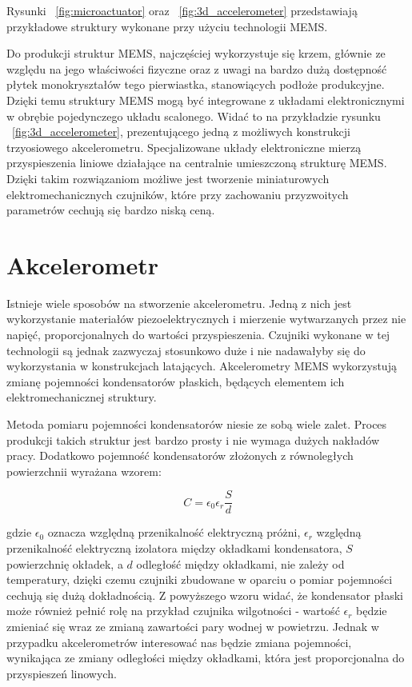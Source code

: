 Rysunki ~\ref{fig:microactuator} oraz ~\ref{fig:3d_accelerometer} przedstawiają przykładowe struktury wykonane przy użyciu technologii MEMS. 

Do produkcji struktur MEMS, najczęściej wykorzystuje się krzem, głównie ze względu na jego właściwości fizyczne oraz z uwagi na bardzo dużą dostępność płytek monokryształów tego pierwiastka, stanowiących podłoże produkcyjne. Dzięki temu struktury MEMS mogą być integrowane z układami elektronicznymi w obrębie pojedynczego układu scalonego. Widać to na przykładzie rysunku ~\ref{fig:3d_accelerometer}, prezentującego jedną z możliwych konstrukcji trzyosiowego akcelerometru. Specjalizowane układy elektroniczne mierzą przyspieszenia liniowe działające na centralnie umieszczoną strukturę MEMS. Dzięki takim rozwiązaniom możliwe jest tworzenie miniaturowych elektromechanicznych czujników, które przy zachowaniu przyzwoitych parametrów cechują się bardzo niską ceną.   

\section{Akcelerometr}

Istnieje wiele sposobów na stworzenie akcelerometru. Jedną z nich jest wykorzystanie materiałów piezoelektrycznych i mierzenie wytwarzanych przez nie napięć, proporcjonalnych do wartości przyspieszenia. Czujniki wykonane w tej technologii są jednak zazwyczaj stosunkowo duże i nie nadawałyby się do wykorzystania w konstrukcjach latających. Akcelerometry MEMS wykorzystują zmianę pojemności kondensatorów płaskich, będących elementem ich elektromechanicznej struktury.

Metoda pomiaru pojemności kondensatorów niesie ze sobą wiele zalet. Proces produkcji takich struktur jest bardzo prosty i nie wymaga dużych nakładów pracy. Dodatkowo pojemność kondensatorów złożonych z równoległych powierzchnii wyrażana wzorem:   

\begin{equation}
C = \epsilon_0\epsilon_r\frac{S}{d}
\end{equation}

gdzie $\epsilon_0$ oznacza względną przenikalność elektryczną próżni, $\epsilon_r$ względną przenikalność elektryczną izolatora między okładkami kondensatora, $S$ powierzchnię okładek, a $d$ odległość między okładkami, nie zależy od temperatury, dzięki czemu czujniki zbudowane w oparciu o pomiar pojemności cechują się dużą dokładnością. Z powyższego wzoru widać, że kondensator płaski może również pełnić rolę na przykład czujnika wilgotności - wartość $\epsilon_r$ będzie zmieniać się wraz ze zmianą zawartości pary wodnej w powietrzu. Jednak w przypadku akcelerometrów interesować nas będzie zmiana pojemności, wynikająca ze zmiany odległości między okładkami, która jest proporcjonalna do przyspieszeń linowych.


